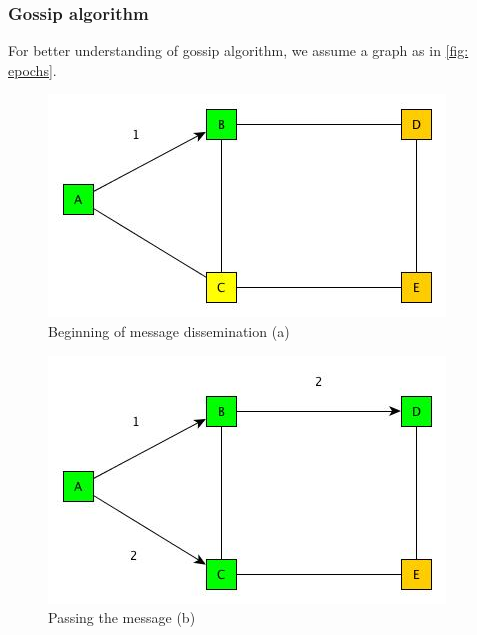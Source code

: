 \subsubsection{Gossip algorithm}
For better understanding of gossip algorithm, we assume a graph as in \ref{fig: epochs}.
\begin{figure}[!h]
   \begin{minipage}[t]{0.45\textwidth}
      \vspace{0pt}
      \includegraphics[width=\linewidth]{figures/network_gossip_1.jpg}
      Beginning of message dissemination (a)
   \end{minipage}
   \hfill
   \begin{minipage}[t]{0.45\textwidth}
      \vspace{0pt}
      \includegraphics[width=\linewidth]{figures/network_gossip_2.jpg}
      Passing the message (b)
   \end{minipage}
   \vspace{5ex}
     \begin{center}
     \begin{minipage}[c]{0.45\textwidth}

\end{minipage}
\end{center}
\end{figure}
